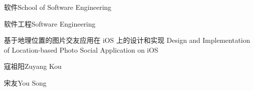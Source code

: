 
\school
{软件}{School of Software Engineering}

\major
{软件工程}{Software Engineering}

\thesistitle
{基于地理位置的图片交友应用在 iOS 上的设计和实现}
{}
{Design and Implementation of Location-based Photo Social Application on iOS}
{}

\thesisauthor
{寇祖阳}{Zuyang Kou}

\teacher
{宋友}{You Song}






